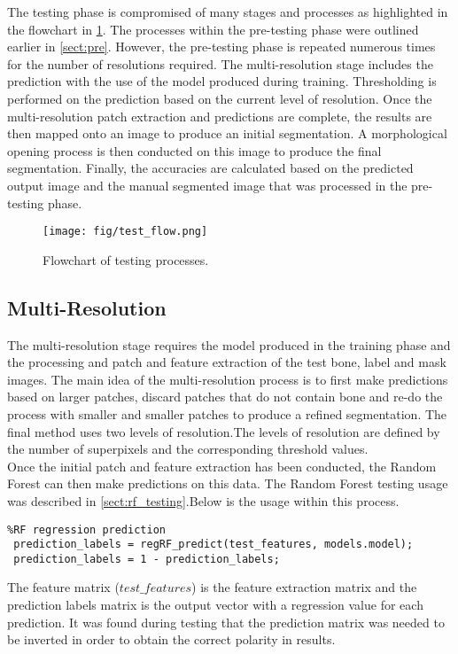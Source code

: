 The testing phase is compromised of many stages and processes as highlighted in the flowchart in \ref{fig:test_flow}. The processes within the pre-testing phase were outlined earlier in \ref{sect:pre}. However, the pre-testing phase is repeated numerous times for the number of resolutions required. The multi-resolution stage includes the prediction with the use of the model produced during training. Thresholding is performed on the prediction based on the current level of resolution. Once the multi-resolution patch extraction and predictions are complete, the results are then mapped onto an image to produce an initial segmentation. A morphological opening process is  then conducted on this image to produce the final segmentation. Finally, the accuracies are calculated based on the predicted output image and the manual segmented image that was processed in the pre-testing phase.

\begin{figure}[H]
\centering
\texttt{[image: fig/test\_flow.png]}
\caption{Flowchart of testing processes.}
\label{fig:test_flow}
\end{figure}

\subsection{Multi-Resolution} 
The multi-resolution stage requires the model produced in the training phase and the processing and patch and feature extraction of the test bone, label and mask images. The main idea of the multi-resolution process is to first make predictions based on larger patches, discard patches that do not contain bone and re-do the process with smaller and smaller patches to produce a refined segmentation.  The final method uses two levels of resolution.The levels of resolution are defined by the number of superpixels and the corresponding threshold values. 
\\[1\baselineskip]
Once the initial patch and feature extraction has been conducted, the Random Forest can then make predictions on this data. The Random Forest testing usage was described in \ref{sect:rf_testing}.Below is the usage within this process. 
\begin{lstlisting}
%RF regression prediction
 prediction_labels = regRF_predict(test_features, models.model);
 prediction_labels = 1 - prediction_labels;
\end{lstlisting}
\bigskip
The feature matrix ($test\_features$) is the feature extraction matrix and the prediction labels matrix is the output vector with a regression value for each prediction. It was found during testing that the prediction matrix was needed to be inverted in order to obtain the correct polarity in results.

